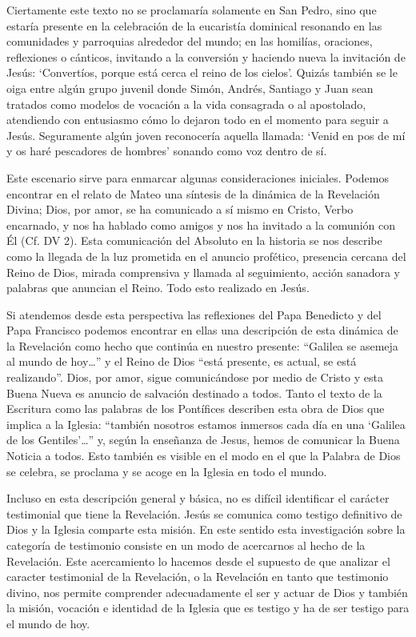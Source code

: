 Ciertamente este texto no se proclamaría solamente en San Pedro, sino que estaría presente en la celebración de la eucaristía dominical resonando en las comunidades y parroquias alrededor del mundo; en las homilías, oraciones, reflexiones o cánticos, invitando a la conversión y haciendo nueva la invitación de Jesús: \enquote*{Convertíos, porque está cerca el reino de los cielos}. Quizás también se le oiga entre algún grupo juvenil donde Simón, Andrés, Santiago y Juan sean tratados como modelos de vocación a la vida consagrada o al apostolado, atendiendo con entusiasmo cómo lo dejaron todo en el momento para seguir a Jesús. Seguramente algún joven reconocería aquella llamada: \enquote*{Venid en pos de mí y os haré pescadores de hombres} sonando como voz dentro de sí.

Este escenario sirve para enmarcar algunas consideraciones iniciales. Podemos encontrar en el relato de Mateo una síntesis de la dinámica de la Revelación Divina; Dios, por amor, se ha comunicado a sí mismo en Cristo, Verbo encarnado, y nos ha hablado como amigos y nos ha invitado a la comunión con Él (Cf. DV 2). Esta comunicación del Absoluto en la historia se nos describe como la llegada de la luz prometida en el anuncio profético, presencia cercana del Reino de Dios, mirada comprensiva y llamada al seguimiento, acción sanadora y palabras que anuncian el Reino. Todo esto realizado en Jesús.

Si atendemos desde esta perspectiva las reflexiones del Papa Benedicto y del Papa Francisco podemos encontrar en ellas una descripción de esta dinámica de la Revelación como hecho que continúa en nuestro presente: ``Galilea se asemeja al mundo de hoy\ldots'' y el Reino de Dios ``está presente, es actual, se está realizando''. Dios, por amor, sigue comunicándose por medio de Cristo y esta Buena Nueva es anuncio de salvación destinado a todos. Tanto el texto de la Escritura como las palabras de los Pontífices describen esta obra de Dios que implica a la Iglesia: ``también nosotros estamos inmersos cada día en una `Galilea de los Gentiles'\ldots'' y, según la enseñanza de Jesus, hemos de comunicar la Buena Noticia a todos. Esto también es visible en el modo en el que la Palabra de Dios se celebra, se proclama y se acoge en la Iglesia en todo el mundo.

Incluso en esta descripción general y básica, no es difícil identificar el carácter testimonial que tiene la Revelación. Jesús se comunica como testigo definitivo de Dios y la Iglesia comparte esta misión. En este sentido esta investigación sobre la categoría de testimonio consiste en un modo de acercarnos al hecho de la Revelación. Este acercamiento lo hacemos desde el supuesto de que analizar el caracter testimonial de la Revelación, o la Revelación en tanto que testimonio divino, nos permite comprender adecuadamente el ser y actuar de Dios y también la misión, vocación e identidad de la Iglesia que es testigo y ha de ser testigo para el mundo de hoy.

